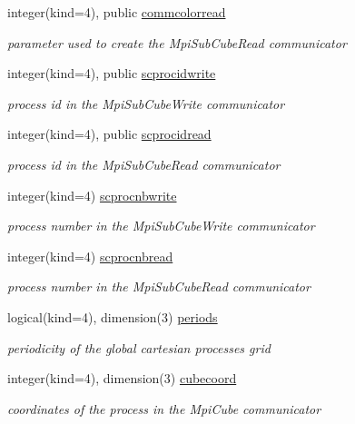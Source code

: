 \begin{DoxyCompactItemize}
integer(kind=4), public \hyperlink{classmodmpicom_ab58830af4e3abbec4491393d1f151ca8}{commcolorread}
\begin{DoxyCompactList}\small\item\em parameter used to create the Mpi\-Sub\-Cube\-Read communicator \end{DoxyCompactList}\item 
integer(kind=4), public \hyperlink{classmodmpicom_abebf60043baa916259ad148a0856c87a}{scprocidwrite}
\begin{DoxyCompactList}\small\item\em process id in the Mpi\-Sub\-Cube\-Write communicator \end{DoxyCompactList}\item 
integer(kind=4), public \hyperlink{classmodmpicom_af5dc4e2e2c054269623303e30bb81ee4}{scprocidread}
\begin{DoxyCompactList}\small\item\em process id in the Mpi\-Sub\-Cube\-Read communicator \end{DoxyCompactList}\item 
integer(kind=4) \hyperlink{classmodmpicom_a8281c8567826b44d76d7a801203c99a8}{scprocnbwrite}
\begin{DoxyCompactList}\small\item\em process number in the Mpi\-Sub\-Cube\-Write communicator \end{DoxyCompactList}\item 
integer(kind=4) \hyperlink{classmodmpicom_a8fde31beaf4b43228d7f93325630cefa}{scprocnbread}
\begin{DoxyCompactList}\small\item\em process number in the Mpi\-Sub\-Cube\-Read communicator \end{DoxyCompactList}\item 
logical(kind=4), dimension(3) \hyperlink{classmodmpicom_a0347e6d8a15028132a57953e6ff823a2}{periods}
\begin{DoxyCompactList}\small\item\em periodicity of the global cartesian processes grid \end{DoxyCompactList}\item 
integer(kind=4), dimension(3) \hyperlink{classmodmpicom_a533718abb8ce3f03b430dfbf9f821069}{cubecoord}
\begin{DoxyCompactList}\small\item\em coordinates of the process in the Mpi\-Cube communicator \end{DoxyCompactList}\end{DoxyCompactItemize}


